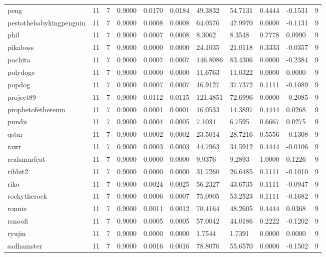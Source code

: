 \begin{table}[htbp]
\begin{tabular}{lllllllllll}
peng & 11 & 7 & 0.9000 & 0.0170 & 0.0184 & 49.3832 & 54.7131 & 0.4444 & -0.1531 & 9 \\
pestothebabykingpenguin & 11 & 7 & 0.9000 & 0.0008 & 0.0008 & 64.0576 & 47.9970 & 0.0000 & -0.1131 & 9 \\
phil & 11 & 7 & 0.9000 & 0.0007 & 0.0008 & 8.3062 & 8.3548 & 0.7778 & 0.0990 & 9 \\
pikaboss & 11 & 7 & 0.9000 & 0.0000 & 0.0000 & 24.1035 & 21.0118 & 0.3333 & -0.0357 & 9 \\
pochita & 11 & 7 & 0.9000 & 0.0007 & 0.0007 & 146.8086 & 83.4306 & 0.0000 & -0.2384 & 9 \\
polydoge & 11 & 7 & 0.9000 & 0.0000 & 0.0000 & 11.6763 & 11.0322 & 0.0000 & 0.0000 & 9 \\
popdog & 11 & 7 & 0.9000 & 0.0007 & 0.0007 & 46.9127 & 37.7372 & 0.1111 & -0.1089 & 9 \\
project89 & 11 & 7 & 0.9000 & 0.0112 & 0.0115 & 121.4851 & 72.6996 & 0.0000 & -0.2085 & 9 \\
prophetofethereum & 11 & 7 & 0.9000 & 0.0001 & 0.0001 & 16.0533 & 14.3897 & 0.4444 & 0.0268 & 9 \\
pundu & 11 & 7 & 0.9000 & 0.0004 & 0.0005 & 7.1034 & 6.7595 & 0.6667 & 0.0275 & 9 \\
qstar & 11 & 7 & 0.9000 & 0.0002 & 0.0002 & 23.5014 & 28.7216 & 0.5556 & -0.1308 & 9 \\
rawr & 11 & 7 & 0.9000 & 0.0003 & 0.0003 & 44.7963 & 34.5912 & 0.4444 & -0.0106 & 9 \\
realsmurfcat & 11 & 7 & 0.9000 & 0.0000 & 0.0000 & 9.9376 & 9.2893 & 1.0000 & 0.1226 & 9 \\
ribbit2 & 11 & 7 & 0.9000 & 0.0000 & 0.0000 & 31.7260 & 26.6485 & 0.1111 & -0.1010 & 9 \\
riko & 11 & 7 & 0.9000 & 0.0024 & 0.0025 & 56.2327 & 43.6735 & 0.1111 & -0.0947 & 9 \\
rockytherock & 11 & 7 & 0.9000 & 0.0006 & 0.0007 & 75.0905 & 53.2523 & 0.1111 & -0.1682 & 9 \\
ronnie & 11 & 7 & 0.9000 & 0.0011 & 0.0012 & 70.4164 & 48.2605 & 0.4444 & 0.0368 & 9 \\
rsnoofi & 11 & 7 & 0.9000 & 0.0005 & 0.0005 & 57.0042 & 44.0186 & 0.2222 & -0.1202 & 9 \\
ryujin & 11 & 7 & 0.9000 & 0.0000 & 0.0000 & 1.7544 & 1.7391 & 0.0000 & 0.0000 & 9 \\
sadhamster & 11 & 7 & 0.9000 & 0.0016 & 0.0016 & 78.8076 & 55.6570 & 0.0000 & -0.1502 & 9 \\

\end{tabular}
\end{table}
